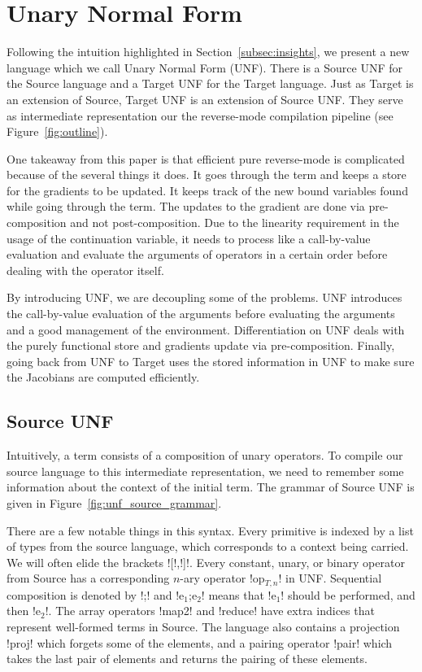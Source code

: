 \section{Unary Normal Form}
\label{sec:unf}

Following the intuition highlighted in Section~\ref{subsec:insights}, 
we present a new language which we call Unary Normal Form (UNF). 
There is a Source UNF for the Source language and a Target UNF for the Target language.
Just as Target is an extension of Source, Target UNF is an extension of Source UNF.
They serve as intermediate representation our the reverse-mode compilation pipeline (see Figure~\ref{fig:outline}).

One takeaway from this paper is that efficient pure reverse-mode is complicated because of the several things it does.
It goes through the term and keeps a store for the gradients to be updated. 
It keeps track of the new bound variables found while going through the term.
The updates to the gradient are done via pre-composition and not post-composition.
Due to the linearity requirement in the usage of the continuation variable, 
it needs to process like a call-by-value evaluation and evaluate the arguments of operators in a certain order before 
dealing with the operator itself.

By introducing UNF, we are decoupling some of the problems.
UNF introduces the call-by-value evaluation of the arguments before evaluating the arguments and a good management of the environment.
Differentiation on UNF deals with the purely functional store and gradients update via pre-composition.
Finally, going back from UNF to Target uses the stored information in UNF to make sure the Jacobians are computed efficiently. 

\subsection{Source UNF} %
\label{sub:Source UNF}

Intuitively, a term consists of a composition of unary operators. 
To compile our source language to this intermediate representation, 
we need to remember some information about the context of the initial term. 
The grammar of Source UNF is given in Figure~\ref{fig:unf_source_grammar}. 



There are a few notable things in this syntax. 
Every primitive is indexed by a list of types from the source language, 
which corresponds to a context being carried. We will often elide the brackets ![!,!]!.
Every constant, unary, or binary operator from Source has a corresponding $n$-ary operator !op$_{T,n}$! in UNF.
Sequential composition is denoted by !;! and !e$_{1}$;e$_{2}$! means that !e$_{1}$! should be performed, and then !e$_{2}$!.
The array operators !map2! and !reduce! have extra indices that represent well-formed terms in Source.
The language also contains a projection !proj! which forgets some of the elements, 
and a pairing operator !pair! which takes the last pair of elements and returns the pairing of these elements.

